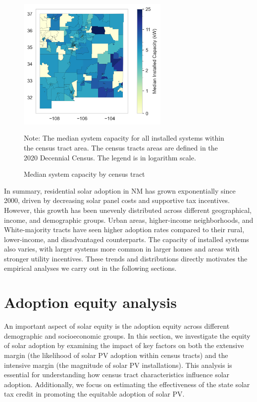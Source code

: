 \documentclass[11pt,twoside,letterpaper]{article}
\begin{document}
\begin{figure}[!ht]
    \centering
\includegraphics[width=0.65\textwidth]{figures/tract_median_capacity_map.png}
    \caption{Median system capacity by census tract}
    \label{fig:median_cap_map}
        \begin{flushleft}
        \footnotesize Note: The median system capacity for all installed systems within the census tract area. The census tracts areas are defined in the 2020 Decennial Census. The legend is in logarithm scale. 
    \end{flushleft}
\end{figure}


In summary, residential solar adoption in NM has grown exponentially since 2000, driven by decreasing solar panel costs and supportive tax incentives. However, this growth has been unevenly distributed across different geographical, income, and demographic groups. Urban areas, higher-income neighborhoods, and White-majority tracts have seen higher adoption rates compared to their rural, lower-income, and disadvantaged counterparts. The capacity of installed systems also varies, with larger systems more common in larger homes and areas with stronger utility incentives. These trends and distributions directly motivates the empirical analyses we carry out in the following sections.


\section{Adoption equity analysis}
\label{sec:adoption_equity}

An important aspect of solar equity is the adoption equity across different demographic and socioeconomic groups. In this section, we investigate the equity of solar adoption by examining the impact of key factors on both the extensive margin (the likelihood of solar PV adoption within census tracts) and the intensive margin (the magnitude of solar PV installations). This analysis is essential for understanding how census tract characteristics influence solar adoption. Additionally, we focus on estimating the effectiveness of the state solar tax credit in promoting the equitable adoption of solar PV.
\end{document}
